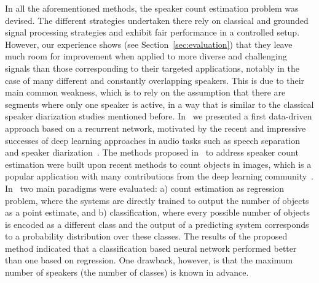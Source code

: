 In all the aforementioned methods, the speaker count estimation problem was devised.
The different strategies undertaken there rely on classical and grounded signal processing strategies and exhibit fair performance in a controlled setup.
However, our experience shows (see Section~\ref{sec:evaluation}) that they leave much room for improvement when applied to more diverse and challenging signals than those corresponding to their targeted applications, notably in the case of many different and constantly overlapping speakers.
This is due to their main common weakness, which is to rely on the assumption that there are segments where only one speaker is active, in a way that is similar to the classical speaker diarization studies mentioned before.
In~\cite{stoeter17} we presented a first data-driven approach based on a recurrent network, motivated by the recent and impressive successes of deep learning approaches in audio tasks such as speech separation~\cite{yu16, hershey16, grais17} and speaker diarization~\cite{yella14, hruz16, garciaromero17}.
The methods proposed in~\cite{stoeter17} to address speaker count estimation were built upon recent methods to count objects in images, which is a popular application with many contributions from the deep learning community~\cite{wang15, chattopadhyay17, khan16, segui15, zhang15, arteta16, marsden16, boominathan16, zhang2015salient}.
In~\cite{stoeter17} two main paradigms were evaluated: a) count estimation as regression problem, where the systems are directly trained to output the number of objects as a point estimate, and b) classification, where every possible number of objects is encoded as a different class and the output of a predicting system corresponds to a probability distribution over these classes.
The results of the proposed method indicated that a classification based neural network performed better than one based on regression.
One drawback, however, is that the maximum number of speakers (the number of classes) is known in advance.


\par

